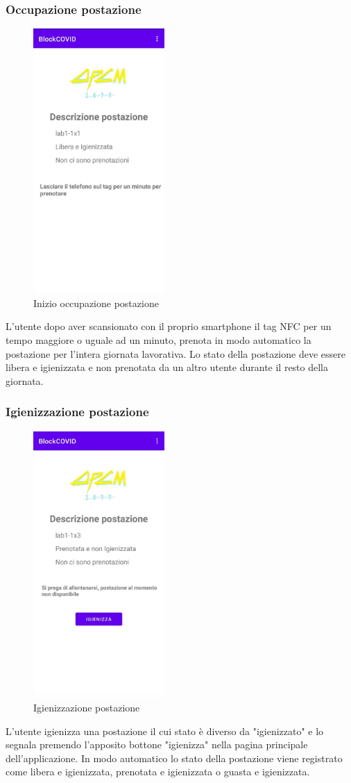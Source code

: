 \subsubsection{Occupazione postazione}
\begin{figure}[H]
	\centering
	\includegraphics[width=5cm]{res/images/DescrizionePostazione1.png}
	\caption{Inizio occupazione postazione}
\end{figure}
L'utente dopo aver scansionato con il proprio smartphone il tag NFC per un tempo maggiore o uguale ad un minuto, prenota in modo automatico la postazione per
l’intera giornata lavorativa. Lo stato della postazione deve essere libera e igienizzata e non prenotata da un altro utente durante il resto della giornata.
\subsubsection{Igienizzazione postazione}
\begin{figure}[H]
	\centering
	\includegraphics[width=5cm]{res/images/DescrizionePostazione3.png}
	\caption{Igienizzazione postazione}
\end{figure}
L'utente igienizza una postazione il cui stato è diverso da "igienizzato" e lo segnala premendo l'apposito bottone "igienizza" nella pagina principale dell'applicazione. In modo automatico lo stato della postazione viene registrato come libera e igienizzata, prenotata e igienizzata o guasta e igienizzata.
